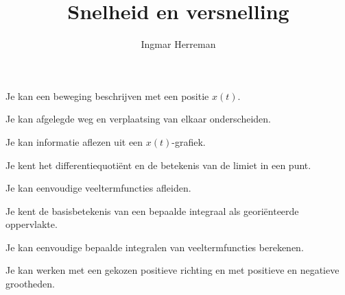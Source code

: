 \documentclass{ximera}
\title{Snelheid en versnelling}
\author{Ingmar Herreman}
\begin{document}



\maketitle




\begin{voorkennis}

 \item Je kan een beweging beschrijven met een positie $x(t)$.

 \item Je kan afgelegde weg en verplaatsing van elkaar onderscheiden.

 \item Je kan informatie aflezen uit een $x(t)$-grafiek.

 \item Je kent het differentiequotiënt en de betekenis van de limiet in een punt.

 \item Je kan eenvoudige veeltermfuncties afleiden.

 \item Je kent de basisbetekenis van een bepaalde integraal als georiënteerde oppervlakte.

 \item Je kan eenvoudige bepaalde integralen van veeltermfuncties berekenen.

 \item Je kan werken met een gekozen positieve richting en met positieve en negatieve grootheden.

\end{voorkennis}
\end{document}
